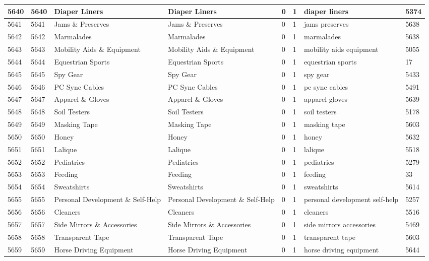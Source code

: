 \begin{longtable}{|l|l|l|l|l|l|l|l|}
5640 & 5640 & Diaper Liners & Diaper Liners & 0 & 1 & diaper liners & 5374 \\ \hline 
5641 & 5641 & Jams \& Preserves & Jams \& Preserves & 0 & 1 & jams preserves & 5638 \\ \hline 
5642 & 5642 & Marmalades & Marmalades & 0 & 1 & marmalades & 5638 \\ \hline 
5643 & 5643 & Mobility Aids \& Equipment & Mobility Aids \& Equipment & 0 & 1 & mobility aids equipment & 5055 \\ \hline 
5644 & 5644 & Equestrian Sports & Equestrian Sports & 0 & 1 & equestrian sports & 17 \\ \hline 
5645 & 5645 & Spy Gear & Spy Gear & 0 & 1 & spy gear & 5433 \\ \hline 
5646 & 5646 & PC Sync Cables & PC Sync Cables & 0 & 1 & pc sync cables & 5491 \\ \hline 
5647 & 5647 & Apparel \& Gloves & Apparel \& Gloves & 0 & 1 & apparel gloves & 5639 \\ \hline 
5648 & 5648 & Soil Testers & Soil Testers & 0 & 1 & soil testers & 5178 \\ \hline 
5649 & 5649 & Masking Tape & Masking Tape & 0 & 1 & masking tape & 5603 \\ \hline 
5650 & 5650 & Honey & Honey & 0 & 1 & honey & 5632 \\ \hline 
5651 & 5651 & Lalique & Lalique & 0 & 1 & lalique & 5518 \\ \hline 
5652 & 5652 & Pediatrics & Pediatrics & 0 & 1 & pediatrics & 5279 \\ \hline 
5653 & 5653 & Feeding & Feeding & 0 & 1 & feeding & 33 \\ \hline 
5654 & 5654 & Sweatshirts & Sweatshirts & 0 & 1 & sweatshirts & 5614 \\ \hline 
5655 & 5655 & Personal Development \& Self-Help & Personal Development \& Self-Help & 0 & 1 & personal development self-help & 5257 \\ \hline 
5656 & 5656 & Cleaners & Cleaners & 0 & 1 & cleaners & 5516 \\ \hline 
5657 & 5657 & Side Mirrors \& Accessories & Side Mirrors \& Accessories & 0 & 1 & side mirrors accessories & 5469 \\ \hline 
5658 & 5658 & Transparent Tape & Transparent Tape & 0 & 1 & transparent tape & 5603 \\ \hline 
5659 & 5659 & Horse Driving Equipment & Horse Driving Equipment & 0 & 1 & horse driving equipment & 5644 \\ \hline 

\end{longtable}
